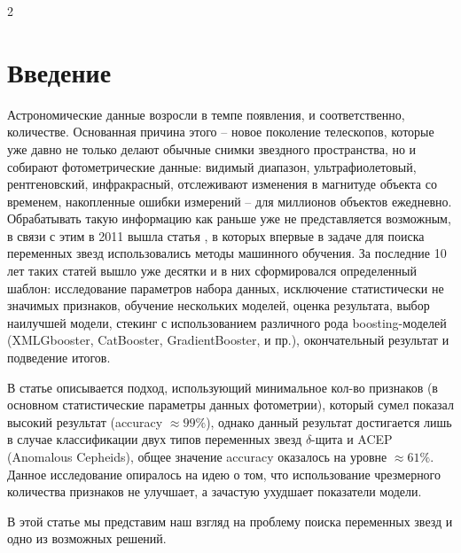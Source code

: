 \documentclass[11pt, a4paper]{article}
\begin{document}
\begin{multicols}{2}
\section{Введение}
Астрономические данные возросли в темпе появления, и соответственно, количестве. Основанная причина этого -- новое поколение телескопов, которые уже давно  не только делают обычные снимки звездного пространства, но и собирают фотометрические данные: видимый диапазон, ультрафиолетовый, рентгеновский, инфракрасный, отслеживают изменения в магнитуде объекта со временем, накопленные ошибки измерений -- для миллионов объектов ежедневно. Обрабатывать такую информацию как раньше уже не представляется возможным, в связи с этим в 2011 вышла статья \autocite{first-article}, в которых впервые в задаче для поиска переменных звезд использовались методы машинного обучения. За последние 10 лет таких статей вышло уже десятки и в них сформировался определенный шаблон: исследование параметров набора данных, исключение статистически не значимых признаков, обучение нескольких моделей, оценка результата, выбор наилучшей модели, стекинг с использованием различного рода boosting-моделей (XMLGbooster, CatBooster, GradientBooster, и пр.), окончательный результат и подведение итогов. 

В статье \autocite{Hosenie2019} описывается подход, использующий минимальное кол-во признаков (в основном статистические параметры данных фотометрии), который сумел показал высокий результат (accuracy $\approx 99\%$), однако данный результат достигается лишь в случае классификации двух типов переменных звезд $\delta$-щита и ACEP (Anomalous
Cepheids), общее значение accuracy оказалось на уровне $\approx 61\%$. Данное исследование опиралось на идею о том, что использование чрезмерного количества признаков не улучшает, а зачастую ухудшает показатели модели.

В этой статье мы представим наш взгляд на проблему поиска переменных звезд и одно из возможных решений. 


\end{multicols}
\end{document}
